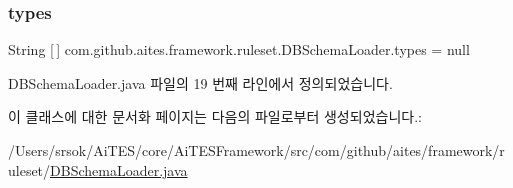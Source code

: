 \mbox{\label{classcom_1_1github_1_1aites_1_1framework_1_1ruleset_1_1_d_b_schema_loader_addaa87f4675041eabcd34e291f108ebe}} 
\subsubsection{\texorpdfstring{types}{types}}
{\footnotesize\ttfamily String \mbox{[}$\,$\mbox{]} com.\+github.\+aites.\+framework.\+ruleset.\+D\+B\+Schema\+Loader.\+types = null\hspace{0.3cm}{\ttfamily [private]}}



D\+B\+Schema\+Loader.\+java 파일의 19 번째 라인에서 정의되었습니다.



이 클래스에 대한 문서화 페이지는 다음의 파일로부터 생성되었습니다.\+:\begin{DoxyCompactItemize}
\item 
/\+Users/srsok/\+Ai\+T\+E\+S/core/\+Ai\+T\+E\+S\+Framework/src/com/github/aites/framework/ruleset/\mbox{\hyperlink{_d_b_schema_loader_8java}{D\+B\+Schema\+Loader.\+java}}\end{DoxyCompactItemize}

